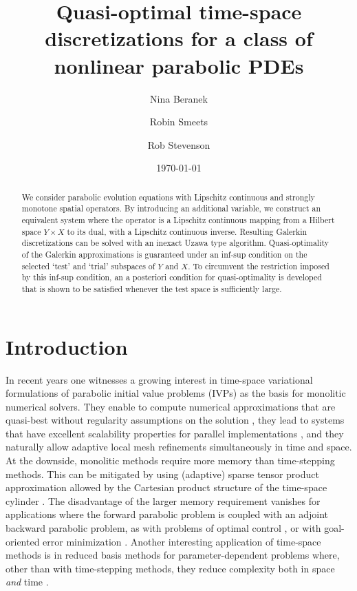 \documentclass{amsart}
\title[Quasi-optimal time-space discretizations for nonlinear parabolic PDEs]{Quasi-optimal time-space discretizations for a class of nonlinear parabolic PDEs}
\date{\today}
\author[N.\ Beranek]{Nina Beranek}
\author[R.K.H.\ Smeets]{Robin Smeets}
\author[R.P.\ Stevenson]{Rob Stevenson}
\numberwithin{equation}{section}
\newcommand{\1}{\mathbb 1}
\begin{document}
\begin{abstract}
We consider parabolic evolution equations with Lipschitz continuous and strongly monotone spatial operators.
By introducing an additional variable, we construct an equivalent system where the operator is a Lipschitz continuous mapping from a Hilbert space $Y \times X$ to its dual, with a Lipschitz continuous inverse. Resulting Galerkin discretizations can be solved with an inexact Uzawa type algorithm.
Quasi-optimality of the Galerkin approximations is guaranteed under an inf-sup condition on the selected `test' and `trial' subspaces of $Y$ and $X$.
To circumvent the restriction imposed by this inf-sup condition, an a posteriori condition for quasi-optimality is developed that is shown to be satisfied whenever the test space is sufficiently large.
 \end{abstract}
\maketitle

\section{Introduction}
In recent years one witnesses a growing interest in time-space variational formulations of parabolic initial value problems (IVPs) as the basis for monolitic numerical solvers.
They enable to compute numerical approximations that are quasi-best without regularity assumptions on the solution \cite{11,249.992}, they lead to systems that have excellent scalability properties for parallel implementations \cite{169.06,306.65,169.065}, and they naturally allow adaptive local mesh refinements simultaneously in time and space.
At the downside, monolitic methods require more memory than time-stepping methods. This can be mitigated by using (adaptive) sparse tensor product approximation allowed by the Cartesian product structure of the time-space cylinder \cite{11,249.991}. The disadvantage of the larger memory requirement vanishes for applications where the forward parabolic problem is coupled with an adjoint backward parabolic problem, as with problems of optimal control \cite{169.053,19.96,75.292,75.2576}, or with goal-oriented error minimization \cite{70.48}.
Another interesting application of time-space methods is in reduced basis methods for parameter-dependent problems where, other than with time-stepping methods, they reduce 
complexity both in space \emph{and} time \cite{75.528,75.292}.
\end{document}
